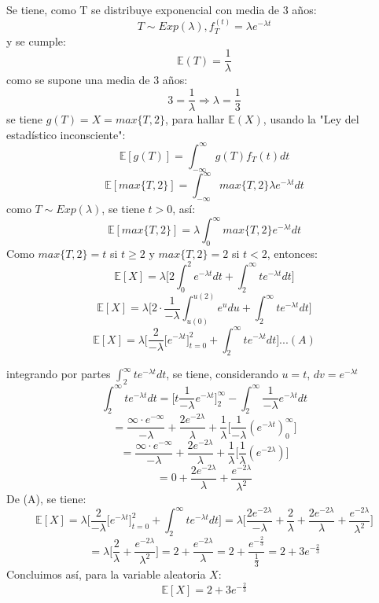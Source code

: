 \documentclass[11pt,a4paper]{report}
\begin{document}
\begin{enumerate}
{			Se tiene, como T se distribuye exponencial con media de 3 años:
				$$ T \sim Exp(\lambda), f_T^{(t)} = \lambda e^{-\lambda t}$$
			y se cumple:
				$$ \mathbb{E}(T) = \frac{1}{\lambda}$$
			como se supone una media de 3 años:
				$$ 3 = \frac{1}{\lambda} \Rightarrow \lambda = \frac{1}{3}$$
			se tiene $g(T) = X = max\{T, 2\}$, para hallar $\mathbb{E}(X)$,
			usando la "Ley del estadístico inconsciente":
				$$ \mathbb{E}[g(T)] = \int_{-\infty}^{\infty} g(T) f_T{(t)}dt $$
				$$ \mathbb{E}[max\{T,2\}] = \int_{-\infty}^{\infty} max\{T,2\}
				 							\lambda e^{-\lambda t} dt $$
			como $T \sim Exp(\lambda)$, se tiene $t > 0$, así:
				$$ \mathbb{E}[max\{T,2\}] = \lambda \int_{0}^{\infty} max\{T,2\}
				 							e^{-\lambda t} dt $$
			Como $max\{T,2\} = t$ si $t \geq 2$ y $max\{T,2\} = 2$ si $t < 2$,
			entonces:
				$$ \mathbb{E}[X] =\lambda \Big[ 2\int_{0}^{2} e^{-\lambda t} dt
				              + \int_{2}^{\infty} t e^{-\lambda t} dt \Big] $$
				$$ \mathbb{E}[X] =\lambda \Big[ 2 \cdot
								 \frac{1}{-\lambda}\int_{u(0)}^{u(2)} e^u du
				              + \int_{2}^{\infty} t e^{-\lambda t} dt \Big] $$
				$$ \mathbb{E}[X] =\lambda \Big[
								 \frac{2}{-\lambda} \Big[ e^{-\lambda t}
								 \Big]_{t=0}^{2}
				              + \int_{2}^{\infty} t e^{-\lambda t} dt \Big]
							  	...(A)$$

			integrando por partes $\int_{2}^{\infty} t e^{-\lambda t} dt$, se
			tiene, considerando $u = t$, $dv = e^{-\lambda t} $
				$$ \int_{2}^{\infty} t e^{-\lambda t} dt
				=  \Big[ t \frac{1}{- \lambda} e^{-\lambda t} \Big]_{2}^{\infty}
					- \int_{2}^{\infty} \frac{1}{- \lambda} e^{-\lambda t} dt$$
				$$ = \frac{\infty \cdot e^{-\infty}}{-\lambda}
				   + \frac{2e^{-2\lambda}}{\lambda} + \frac{1}{\lambda}
				    \Big[ \frac{1}{- \lambda } (e^{-\lambda
					t})_{0}^{\infty}\Big]$$
				$$ = \frac{\infty \cdot e^{-\infty}}{-\lambda}
				   + \frac{2e^{-2\lambda}}{\lambda} + \frac{1}{\lambda}
				    \Big[ \frac{1}{\lambda } (e^{-2 \lambda})\Big]$$
				$$ = 0 + \frac{2e^{-2\lambda}}{\lambda}
				   + \frac{ e^{-2 \lambda} }{\lambda^2} $$
			De (A), se tiene:
				$$ \mathbb{E}[X] =\lambda \Big[
								 \frac{2}{-\lambda} \Big[ e^{-\lambda t}
								 \Big]_{t=0}^{2}
							  + \int_{2}^{\infty} t e^{-\lambda t} dt \Big]
					= \lambda \Big[ \frac{2e^{-2\lambda}}{-\lambda}
								  +	\frac{2}{\lambda}
								  + \frac{2e^{-2\lambda}}{\lambda}
								  + \frac{ e^{-2 \lambda} }{\lambda^2} \Big]$$
				$$ = \lambda \Big[ \frac{2}{\lambda}
							     + \frac{ e^{-2 \lambda} }{\lambda^2} \Big]
				   = 2 + \frac{ e^{-2 \lambda} }{\lambda}
				   = 2 + \frac{ e^{- \frac{2}{3}} }{\frac{1}{3}}
				   = 2 + 3e^{-\frac{2}{3}} $$
			Concluimos así, para la variable aleatoria $X$:
				$$ \mathbb{E}[X] = 2 + 3e^{-\frac{2}{3}} $$

}
\end{enumerate}
\end{document}
